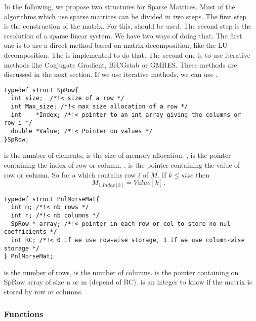 In the following, we propose two structures for Sparse Matrices.  Must of the
algorithms which use sparse matrices can be divided in two steps.  The first
step is the construction of the matrix. For this,  should
be used. The second step is the resolution of a sparse linear system. We
have two ways of doing that. The first one is to use a direct method based on
matrix-decomposition, like the LU decomposition. The  is
implemented to do that. The second one is to use iterative methods like
Conjugate Gradient, BICGstab or GMRES. These methods are discussed in the next
section. If we use iterative methods, we can use . 

\begin{verbatim}
typedef struct SpRow{
  int size;  /*!< size of a row */
  int Max_size; /*!< max size allocation of a row */
  int    *Index; /*!< pointer to an int array giving the columns or row i */
  double *Value; /*!< Pointer on values */
}SpRow;
\end{verbatim}
 is the number of elements, 
 is the size of memory allocation.
, is the pointer containing the index of row or column, 
, is the pointer containing the value of row or column.
So for a  which contains row $i$ of $M$.
If $k \leq size $ then
$$M_{i, Index[k]}=Value[k].$$  

\begin{verbatim}
typedef struct PnlMorseMat{
  int m; /*!< nb rows */ 
  int n; /*!< nb columns */ 
  SpRow * array; /*!< pointer in each row or col to store no nul coefficients */
  int RC; /*!< 0 if we use row-wise storage, 1 if we use column-wise storage */ 
} PnlMorseMat;
\end{verbatim}
 is the number of rows,  is the number of columns.
 is the pointer containing on SpRow array of size n or m (depend of
RC).
 is an integer to know if the matrix is stored by row or columns.

\subsubsection{Functions}
